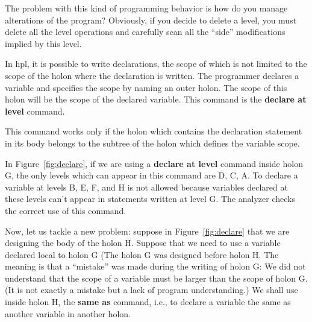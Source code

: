 \documentclass[openany,nobib]{tufte-book}
\newcommand{\kw}[1]{{\bf #1}}
\begin{document}
The problem with this kind of programming behavior is how do you manage
alterations of the program? Obviously, if you decide to delete a level, you
must delete all the level operations and carefully scan all the ``side''
modifications implied by this level.

In {\sc hpl}, it is possible
to write declarations, the scope of which is not limited to the scope of the
holon where the declaration is written. The programmer declares a variable and
specifies the scope by naming an outer holon. The scope of this holon will be
the scope of the declared variable. This command is the \kw{declare at level}
command.

This command works only if the holon which contains the declaration statement
in its body belongs to the subtree of the holon which defines the variable
scope.

\begin{marginfigure}[3cm]
\caption{A holon with different scopes.}
\label{fig:declare}
\end{marginfigure}

In Figure~\ref{fig:declare}, if we are using a \kw{declare at level} command
inside holon G, the only levels which can appear in this command are D, C, A.
To declare a variable at levels B, E, F, and H is not allowed because variables
declared at these levels can't appear in statements written at level G. The
analyzer checks the correct use of this command.

Now, let us tackle a new problem: suppose in Figure~\ref{fig:declare} that we
are designing the body of the holon H. Suppose that we need to use a variable
declared local to holon G (The holon G was designed before holon H. The meaning
is that a ``mistake'' was made during the writing of holon G: We did not
understand that the scope of a variable must be larger than the scope of holon
G. (It is not exactly a mistake but a lack of program understanding.)
We shall use inside holon H, the \kw{same as} command, i.e., to declare a
variable the same as another variable in another holon.
\end{document}
